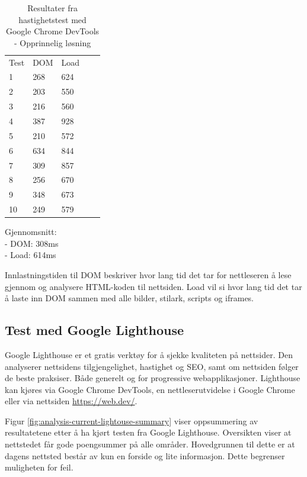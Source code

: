 \begin{table}[H]
\begin{center}
\begin{tabular}{lllll}
Test & DOM & Load &  &  \\
1 & 268 & 624 &  &  \\
2 & 203 & 550 &  &  \\
3 & 216 & 560 &  &  \\
4 & 387 & 928 &  &  \\
5 & 210 & 572 &  &  \\
6 & 634 & 844 &  &  \\
7 & 309 & 857 &  &  \\
8 & 256 & 670 &  &  \\
9 & 348 & 673 &  &  \\
10 & 249 & 579 &  &  \\
\end{tabular}
\end{center}
\caption{\label{tab:table-analysis-current-website}Resultater fra hastighetstest med Google Chrome DevTools - Opprinnelig løsning}
\end{table}

Gjennomsnitt:\\
- DOM: 308ms\\
- Load: 614ms

Innlastningstiden til DOM beskriver hvor lang tid det tar for nettleseren å lese gjennom og analysere HTML-koden til nettsiden. Load vil si hvor lang tid det tar å laste inn DOM sammen med alle bilder, stilark, scripts og iframes.

\subsection{Test med Google Lighthouse}
\label{sec:analysis-current-lighthouse}
\label{sec:google-lighthouse}
Google Lighthouse \cite{google2018lig} er et gratis verktøy for å sjekke kvaliteten på nettsider. Den analyserer nettsidens tilgjengelighet, hastighet og SEO, samt om nettsiden følger de beste praksiser. Både generelt og for progressive webapplikasjoner. Lighthouse kan kjøres via Google Chrome DevTools, en nettleserutvidelse i Google Chrome eller via nettsiden \url{https://web.dev/}.

Figur \ref{fig:analysis-current-lightouse-summary} viser oppsummering av resultatetene etter å ha kjørt testen fra Google Lighthouse. Oversikten viser at nettstedet får gode poengsummer på alle områder. Hovedgrunnen til dette er at dagens nettsted består av kun en forside og lite informasjon. Dette begrenser muligheten for feil.


